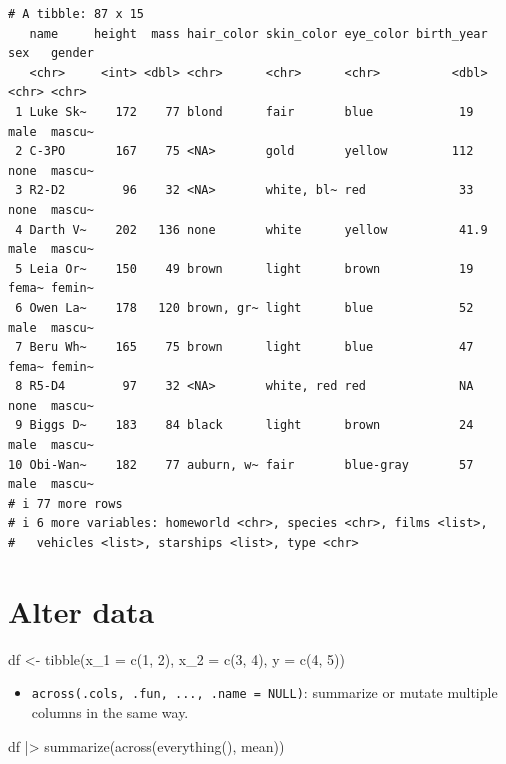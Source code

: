 \documentclass[
  letterpaper,
  DIV=11,
  numbers=noendperiod]{scrreprt}
\newenvironment{Shaded}{\begin{snugshade}}{\end{snugshade}}
\newcommand{\AttributeTok}[1]{\textcolor[rgb]{0.40,0.45,0.13}{#1}}
\newcommand{\DecValTok}[1]{\textcolor[rgb]{0.68,0.00,0.00}{#1}}
\newcommand{\FunctionTok}[1]{\textcolor[rgb]{0.28,0.35,0.67}{#1}}
\newcommand{\NormalTok}[1]{\textcolor[rgb]{0.00,0.23,0.31}{#1}}
\newcommand{\OtherTok}[1]{\textcolor[rgb]{0.00,0.23,0.31}{#1}}
\newcommand{\SpecialCharTok}[1]{\textcolor[rgb]{0.37,0.37,0.37}{#1}}
\providecommand{\tightlist}{%
  \setlength{\itemsep}{0pt}\setlength{\parskip}{0pt}}\usepackage{longtable,booktabs,array}
\begin{document}
\begin{verbatim}
# A tibble: 87 x 15
   name     height  mass hair_color skin_color eye_color birth_year sex   gender
   <chr>     <int> <dbl> <chr>      <chr>      <chr>          <dbl> <chr> <chr> 
 1 Luke Sk~    172    77 blond      fair       blue            19   male  mascu~
 2 C-3PO       167    75 <NA>       gold       yellow         112   none  mascu~
 3 R2-D2        96    32 <NA>       white, bl~ red             33   none  mascu~
 4 Darth V~    202   136 none       white      yellow          41.9 male  mascu~
 5 Leia Or~    150    49 brown      light      brown           19   fema~ femin~
 6 Owen La~    178   120 brown, gr~ light      blue            52   male  mascu~
 7 Beru Wh~    165    75 brown      light      blue            47   fema~ femin~
 8 R5-D4        97    32 <NA>       white, red red             NA   none  mascu~
 9 Biggs D~    183    84 black      light      brown           24   male  mascu~
10 Obi-Wan~    182    77 auburn, w~ fair       blue-gray       57   male  mascu~
# i 77 more rows
# i 6 more variables: homeworld <chr>, species <chr>, films <list>,
#   vehicles <list>, starships <list>, type <chr>
\end{verbatim}

\hypertarget{alter-data}{%
\chapter{Alter data}\label{alter-data}}

\begin{Shaded}
\begin{Highlighting}[]
\NormalTok{df }\OtherTok{\textless{}{-}} \FunctionTok{tibble}\NormalTok{(}\AttributeTok{x\_1 =} \FunctionTok{c}\NormalTok{(}\DecValTok{1}\NormalTok{, }\DecValTok{2}\NormalTok{), }\AttributeTok{x\_2 =} \FunctionTok{c}\NormalTok{(}\DecValTok{3}\NormalTok{, }\DecValTok{4}\NormalTok{), }\AttributeTok{y =} \FunctionTok{c}\NormalTok{(}\DecValTok{4}\NormalTok{, }\DecValTok{5}\NormalTok{))}
\end{Highlighting}
\end{Shaded}

\begin{itemize}
\tightlist
\item
  \texttt{across(.cols,\ .fun,\ ...,\ .name\ =\ NULL)}: summarize or
  mutate multiple columns in the same way.
\end{itemize}

\begin{Shaded}
\begin{Highlighting}[]
\NormalTok{df }\SpecialCharTok{|\textgreater{}} \FunctionTok{summarize}\NormalTok{(}\FunctionTok{across}\NormalTok{(}\FunctionTok{everything}\NormalTok{(), mean))}
\end{Highlighting}
\end{Shaded}
\end{document}
